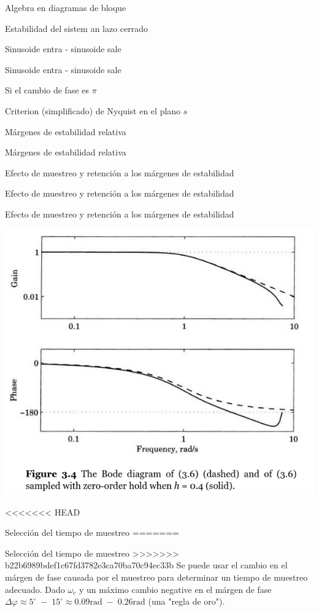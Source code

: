 \documentclass[presentation,aspectratio=169]{beamer}
\begin{document}
\begin{frame}[label={sec:org8e8e439}]{Algebra en diagramas de bloque}
\begin{frame}[label={sec:org5218f19}]{Estabilidad del sistem an lazo cerrado}
\begin{frame}[label={sec:org4ce2307}]{Sinusoide entra - sinusoide sale}
\begin{frame}[label={sec:orgc598966}]{Sinusoide entra - sinusoide sale}
\begin{frame}[label={sec:orgbd54147}]{Si el cambio de fase es \(\pi\)}
\begin{frame}[label={sec:orgf06388b}]{Criterion (simplificado) de Nyquist en el plano \(s\)}
\begin{frame}[label={sec:org5967884}]{Márgenes de estabilidad relativa}
\begin{frame}[label={sec:orgb5ba0e3}]{Márgenes de estabilidad relativa}
\begin{frame}[label={sec:orga8344a9}]{Efecto de muestreo y retención a los márgenes de estabilidad}
\begin{frame}[label={sec:org5e3653d}]{Efecto de muestreo y retención a los márgenes de estabilidad}
\begin{frame}[label={sec:org77c163e}]{Efecto de muestreo y retención a los márgenes de estabilidad}
\begin{center}
\includegraphics[width=0.5\linewidth]{../../figures/fig3-4.png}
\end{center}
\end{frame}

<<<<<<< HEAD
\begin{frame}[label={sec:orgd9a9d5d}]{Selección del tiempo de muestreo}
=======
\begin{frame}[label={sec:org8934d24}]{Selección del tiempo de muestreo}
>>>>>>> b22b6989bdef1c67fd3782e3ca70ba70c94ec33b
Se puede usar el cambio en el márgen de fase causada por el muestreo para determinar un tiempo de muestreo adecuado. Dado \(\omega_c\) y un máximo cambio negative en el márgen de fase \(\Delta\varphi \approx 5^\circ\; - \; 15^\circ \approx 0.09 \text{rad}\; - \; 0.26\text{rad}\) (una "regla de oro").

\begin{center}
\end{center}
\end{frame}
\end{frame}
\end{frame}
\end{frame}
\end{frame}
\end{frame}
\end{frame}
\end{frame}
\end{frame}
\end{frame}
\end{frame}
\end{frame}
\end{document}
